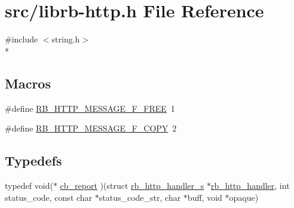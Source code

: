 \hypertarget{librb-http_8h}{\section{src/librb-\/http.h File Reference}
\label{librb-http_8h}
}
{\ttfamily \#include $<$string.\-h$>$}\\*
\subsection*{Macros}
\begin{DoxyCompactItemize}
\item 
\#define \hyperlink{librb-http_8h_aef79f44f520e54cbedce1068fe324720}{R\-B\-\_\-\-H\-T\-T\-P\-\_\-\-M\-E\-S\-S\-A\-G\-E\-\_\-\-F\-\_\-\-F\-R\-E\-E}~1
\item 
\#define \hyperlink{librb-http_8h_a0ffdecd586e5dc8f1eeede6bac9bc19f}{R\-B\-\_\-\-H\-T\-T\-P\-\_\-\-M\-E\-S\-S\-A\-G\-E\-\_\-\-F\-\_\-\-C\-O\-P\-Y}~2
\end{DoxyCompactItemize}
\subsection*{Typedefs}
\begin{DoxyCompactItemize}
\item 
typedef void($\ast$ \hyperlink{librb-http_8h_a04bb44224e2874cbf2df16042f2a4c53}{cb\-\_\-report} )(struct \hyperlink{structrb__http__handler__s}{rb\-\_\-http\-\_\-handler\-\_\-s} $\ast$\hyperlink{rb__http__handler_8c_a68c2a5bd671ddb123e3f38057b5c45f6}{rb\-\_\-http\-\_\-handler}, int status\-\_\-code, const char $\ast$status\-\_\-code\-\_\-str, char $\ast$buff, void $\ast$opaque)
\end{DoxyCompactItemize}
